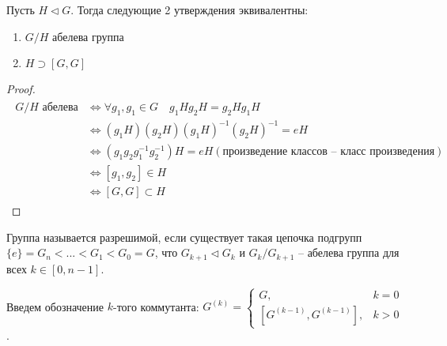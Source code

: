 \begin{theorem}
    Пусть $H \lhd G$. 
    Тогда следующие 2 утверждения эквивалентны: 
    \begin{enumerate}
        \item $G / H$ абелева группа
        \item $H \supset [G, G]$
    \end{enumerate}
\end{theorem}
\begin{proof} \quad \\
    \begin{gather*}
        \begin{split}
            \text{$G / H$ абелева} 
            &\Leftrightarrow \forall g_1, g_1 \in G \quad g_1Hg_2H = g_2Hg_1H \\
            &\Leftrightarrow (g_1H)(g_2H)(g_1H)^{-1}(g_2H)^{-1} = eH  \\
            &\Leftrightarrow (g_1g_2g_1^{-1}g_2^{-1})H = eH (\text{произведение классов -- класс произведения})\\
            &\Leftrightarrow [g_1, g_2] \in H \\
            &\Leftrightarrow [G, G] \subset H
        \end{split}
    \end{gather*}
\end{proof}

\begin{conj}
    Группа называется разрешимой, если существует такая цепочка подгрупп \\ $\{e\} = G_n < ... < G_1 < G_0 = G$, что $G_{k + 1} \lhd G_k$ и $G_k / G_{k + 1}$ -- абелева группа для всех $k \in [0, n - 1]$.
\end{conj}
Введем обозначение $k$-того коммутанта: 
$G^{(k)} = \begin{cases}
    G, & k = 0 \\
    [G^{(k - 1)}, G^{(k - 1)}], & k > 0
 \end{cases}$.
 
